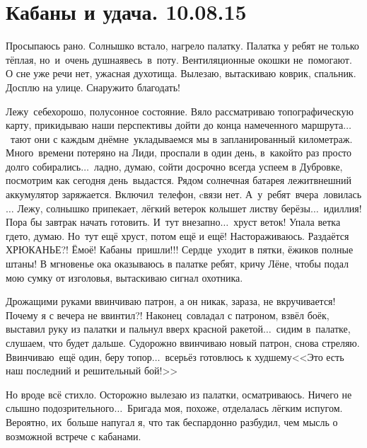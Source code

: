 \chapter{Кабаны и удача. 10.08.15}

Просыпаюсь рано. Солнышко встало, нагрело палатку. Палатка у ребят не только тёплая, но~и~очень душная\mdash весь~в~поту. Вентиляционные окошки не~помогают. О сне уже речи нет, ужасная духотища. Вылезаю, вытаскиваю коврик, спальник. Досплю на улице. Снаружи\sdash то благодать! 

Лежу~себе\mdash хорошо, полусонное состояние. Вяло рассматриваю топографическую карту, прикидываю наши перспективы дойти до конца намеченного маршрута$\ldots$~тают они с каждым днём\mdash не~укладываемся мы в запланированный километраж. Много~времени потеряно на Лиди, проспали в один день, в~какой\sdash то раз просто долго собирались$\ldots$~ладно, думаю, сойти досрочно всегда успеем в Дубровке, посмотрим как сегодня день~выдастся. Рядом солнечная батарея лежит\mdash внешний аккумулятор заряжается. Включил~телефон, cвязи нет. А~у~ребят~вчера~ловилась$\ldots$ 
\newpage
Лежу, солнышко припекает, лёгкий ветерок колышет листву берёзы$\ldots$~идиллия! Пора бы завтрак начать готовить. И~тут внезапно$\ldots$~хруст веток! Упала ветка где\sdash то, думаю. Но~тут ещё хруст, потом ещё и ещё! Настораживаюсь. Раздаётся ХРЮКАНЬЕ?! Ё\sdash моё! Кабаны~пришли!!! Сердце~уходит в пятки, ёжиков полные штаны! В мгновенье ока оказываюсь в палатке ребят, кричу Лёне, чтобы подал мою сумку от изголовья, вытаскиваю сигнал охотника. 

Дрожащими руками ввинчиваю патрон, а он никак, зараза, не вкручивается! Почему я с вечера не ввинтил?! Наконец~совладал с патроном, взвёл боёк, выставил руку из палатки и пальнул вверх красной ракетой$\ldots$~сидим в~палатке, слушаем, что будет дальше. Судорожно ввинчиваю новый патрон, снова стреляю. Ввинчиваю~ещё один, беру топор$\ldots$~всерьёз готовлюсь к худшему\mdash <<Это есть наш последний и решительный бой!>> 

Но вроде всё стихло. Осторожно вылезаю из палатки, осматриваюсь. Ничего не слышно подозрительного$\ldots$~Бригада моя, похоже, отделалась лёгким испугом. Вероятно, их~больше напугал я, что так беспардонно разбудил, чем мысль о возможной встрече с кабанами.

